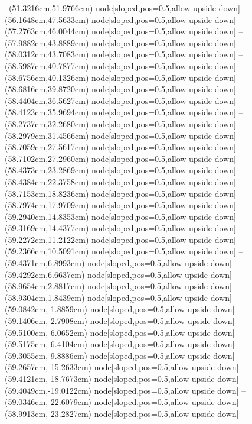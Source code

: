--(51.3216cm,51.9766cm) node[sloped,pos=0.5,allow upside down]{\ArrowIn}
--(56.1648cm,47.5633cm) node[sloped,pos=0.5,allow upside down]{\ArrowIn}
--(57.2763cm,46.0044cm) node[sloped,pos=0.5,allow upside down]{\ArrowIn}
--(57.9882cm,43.8889cm) node[sloped,pos=0.5,allow upside down]{\ArrowIn}
--(58.0312cm,43.7083cm) node[sloped,pos=0.5,allow upside down]{\arrowIn}
--(58.5987cm,40.7877cm) node[sloped,pos=0.5,allow upside down]{\ArrowIn}
--(58.6756cm,40.1326cm) node[sloped,pos=0.5,allow upside down]{\arrowIn}
--(58.6816cm,39.8720cm) node[sloped,pos=0.5,allow upside down]{\arrowIn}
--(58.4404cm,36.5627cm) node[sloped,pos=0.5,allow upside down]{\ArrowIn}
--(58.4123cm,35.9694cm) node[sloped,pos=0.5,allow upside down]{\arrowIn}
--(58.2737cm,32.2680cm) node[sloped,pos=0.5,allow upside down]{\ArrowIn}
--(58.2979cm,31.4566cm) node[sloped,pos=0.5,allow upside down]{\arrowIn}
--(58.7059cm,27.5617cm) node[sloped,pos=0.5,allow upside down]{\ArrowIn}
--(58.7102cm,27.2960cm) node[sloped,pos=0.5,allow upside down]{\arrowIn}
--(58.4373cm,23.2869cm) node[sloped,pos=0.5,allow upside down]{\ArrowIn}
--(58.4384cm,22.3758cm) node[sloped,pos=0.5,allow upside down]{\arrowIn}
--(58.7153cm,18.8236cm) node[sloped,pos=0.5,allow upside down]{\ArrowIn}
--(58.7974cm,17.9709cm) node[sloped,pos=0.5,allow upside down]{\arrowIn}
--(59.2940cm,14.8353cm) node[sloped,pos=0.5,allow upside down]{\ArrowIn}
--(59.3169cm,14.4377cm) node[sloped,pos=0.5,allow upside down]{\arrowIn}
--(59.2272cm,11.2122cm) node[sloped,pos=0.5,allow upside down]{\ArrowIn}
--(59.2366cm,10.5091cm) node[sloped,pos=0.5,allow upside down]{\arrowIn}
--(59.4371cm,6.8993cm) node[sloped,pos=0.5,allow upside down]{\ArrowIn}
--(59.4292cm,6.6637cm) node[sloped,pos=0.5,allow upside down]{\arrowIn}
--(58.9654cm,2.8817cm) node[sloped,pos=0.5,allow upside down]{\ArrowIn}
--(58.9304cm,1.8439cm) node[sloped,pos=0.5,allow upside down]{\ArrowIn}
--(59.0842cm,-1.8859cm) node[sloped,pos=0.5,allow upside down]{\ArrowIn}
--(59.1406cm,-2.7908cm) node[sloped,pos=0.5,allow upside down]{\arrowIn}
--(59.5100cm,-6.0652cm) node[sloped,pos=0.5,allow upside down]{\ArrowIn}
--(59.5175cm,-6.4104cm) node[sloped,pos=0.5,allow upside down]{\arrowIn}
--(59.3055cm,-9.8886cm) node[sloped,pos=0.5,allow upside down]{\ArrowIn}
--(59.2657cm,-15.2633cm) node[sloped,pos=0.5,allow upside down]{\ArrowIn}
--(59.4121cm,-18.7673cm) node[sloped,pos=0.5,allow upside down]{\ArrowIn}
--(59.4049cm,-19.0122cm) node[sloped,pos=0.5,allow upside down]{\arrowIn}
--(59.0346cm,-22.6079cm) node[sloped,pos=0.5,allow upside down]{\ArrowIn}
--(58.9913cm,-23.2827cm) node[sloped,pos=0.5,allow upside down]{\arrowIn}
